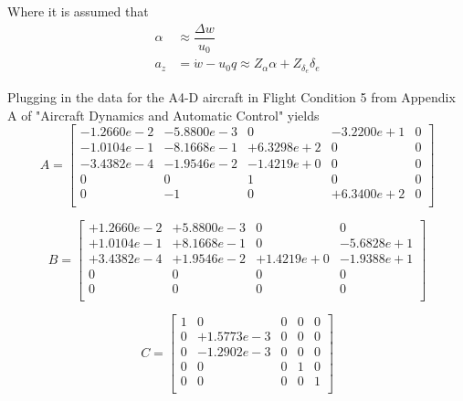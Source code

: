 \documentclass[12pt]{article}
\begin{document}
\noindent Where it is assumed that
\begin{equation*}
\begin{split}
\alpha & \approx \dfrac{\Delta w}{u_0}\\
   a_z & = \dot{w} - u_0 q \approx Z_{\alpha} \alpha + Z_{\delta_e} \delta_e
\end{split}
\end{equation*}

\noindent Plugging in the data for the A4-D aircraft in Flight Condition 5 from Appendix A of "Aircraft Dynamics and Automatic Control" yields
\begin{equation*}
A =
\begin{bmatrix}
  -1.2660e-2 & -5.8800e-3 &          0 & -3.2200e+1  &          0 \\
  -1.0104e-1 & -8.1668e-1 & +6.3298e+2 &          0  &          0 \\
  -3.4382e-4 & -1.9546e-2 & -1.4219e+0 &          0  &          0 \\
           0 &          0 &          1 &          0  &          0 \\
           0 &         -1 &          0 & +6.3400e+2  &          0 \\
\end{bmatrix}
\end{equation*}

\begin{equation*}
B =
\begin{bmatrix}
   +1.2660e-2 & +5.8800e-3 &          0 &          0 \\
   +1.0104e-1 & +8.1668e-1 &          0 & -5.6828e+1 \\
   +3.4382e-4 & +1.9546e-2 & +1.4219e+0 & -1.9388e+1 \\
            0 &          0 &          0 &          0 \\
            0 &          0 &          0 &          0 \\
\end{bmatrix}
\end{equation*}

\begin{equation*}
C =
\begin{bmatrix}
           1 &          0 & 0 & 0 & 0 \\
           0 & +1.5773e-3 & 0 & 0 & 0 \\
           0 & -1.2902e-3 & 0 & 0 & 0 \\
           0 &          0 & 0 & 1 & 0 \\
           0 &          0 & 0 & 0 & 1 \\
\end{bmatrix}
\end{equation*}
\end{document}
